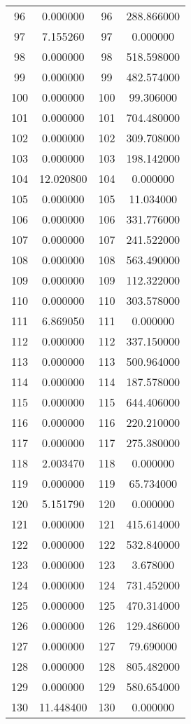 \documentclass[12pt]{article}
\begin{document}
\begin{longtable}{@{}cccc@{}}
96 & 0.000000 & 96 & 288.866000 \\
97 & 7.155260 & 97 & 0.000000 \\
98 & 0.000000 & 98 & 518.598000 \\
99 & 0.000000 & 99 & 482.574000 \\
100 & 0.000000 & 100 & 99.306000 \\
101 & 0.000000 & 101 & 704.480000 \\
102 & 0.000000 & 102 & 309.708000 \\
103 & 0.000000 & 103 & 198.142000 \\
104 & 12.020800 & 104 & 0.000000 \\
105 & 0.000000 & 105 & 11.034000 \\
106 & 0.000000 & 106 & 331.776000 \\
107 & 0.000000 & 107 & 241.522000 \\
108 & 0.000000 & 108 & 563.490000 \\
109 & 0.000000 & 109 & 112.322000 \\
110 & 0.000000 & 110 & 303.578000 \\
111 & 6.869050 & 111 & 0.000000 \\
112 & 0.000000 & 112 & 337.150000 \\
113 & 0.000000 & 113 & 500.964000 \\
114 & 0.000000 & 114 & 187.578000 \\
115 & 0.000000 & 115 & 644.406000 \\
116 & 0.000000 & 116 & 220.210000 \\
117 & 0.000000 & 117 & 275.380000 \\
118 & 2.003470 & 118 & 0.000000 \\
119 & 0.000000 & 119 & 65.734000 \\
120 & 5.151790 & 120 & 0.000000 \\
121 & 0.000000 & 121 & 415.614000 \\
122 & 0.000000 & 122 & 532.840000 \\
123 & 0.000000 & 123 & 3.678000 \\
124 & 0.000000 & 124 & 731.452000 \\
125 & 0.000000 & 125 & 470.314000 \\
126 & 0.000000 & 126 & 129.486000 \\
127 & 0.000000 & 127 & 79.690000 \\
128 & 0.000000 & 128 & 805.482000 \\
129 & 0.000000 & 129 & 580.654000 \\
130 & 11.448400 & 130 & 0.000000 \\

\end{longtable}
\end{document}
